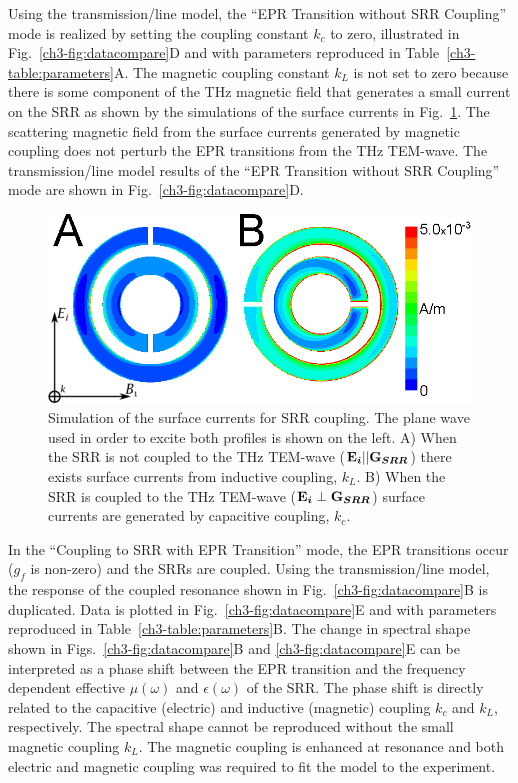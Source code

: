 Using the transmission\-/line model, the ``EPR Transition without SRR Coupling'' mode is realized by setting the coupling constant $k_c$ to zero, illustrated in Fig.~\ref{ch3-fig:datacompare}D and with parameters reproduced in Table~\ref{ch3-table:parameters}A. The magnetic coupling constant $k_L$ is not set to zero because there is some component of the THz magnetic field that generates a small current on the SRR as shown by the simulations of the surface currents in Fig.~\ref{ch3-fig:surfacecurrent}. The scattering magnetic field from the surface currents generated by magnetic coupling does not perturb the EPR transitions from the THz TEM-wave. The transmission\-/line model results of the ``EPR Transition without SRR Coupling'' mode are shown in Fig.~\ref{ch3-fig:datacompare}D.

\begin{figure}[htbp]\centering
  \includegraphics{Kapitel/Ch3-Images/SurfaceCurrent-THz.eps}%
  \caption[Simulation of the surface currents for SRR coupling.]{Simulation of the surface currents for SRR coupling. The plane wave used in order to excite both profiles is shown on the left. A) When the SRR is not coupled to the THz TEM-wave ($\textbf{E}\boldsymbol{_{i}}||\textbf{G}\boldsymbol{_{SRR}}$) there exists surface currents from inductive coupling, $k_L$. B) When the SRR is coupled to the THz TEM-wave ($\textbf{E}\boldsymbol{_{i}}\perp\textbf{G}\boldsymbol{_{SRR}}$) surface currents are generated by capacitive coupling, $k_c$.} \label{ch3-fig:surfacecurrent}
\end{figure}


In the ``Coupling to SRR with EPR Transition'' mode, the EPR transitions occur ($g_f$ is non-zero) and the SRRs are coupled. Using the transmission\-/line model, the response of the coupled resonance shown in Fig.~\ref{ch3-fig:datacompare}B is duplicated. Data is plotted in Fig.~\ref{ch3-fig:datacompare}E and with parameters reproduced in Table~\ref{ch3-table:parameters}B. The change in spectral shape shown in Figs.~\ref{ch3-fig:datacompare}B and \ref{ch3-fig:datacompare}E can be interpreted as a phase shift between the EPR transition and the frequency dependent effective $\mu(\omega)$ and $\epsilon(\omega)$ of the SRR. The phase shift is directly related to the capacitive (electric) and inductive (magnetic) coupling $k_c$ and $k_L$, respectively. The spectral shape cannot be reproduced without the small magnetic coupling $k_L$. The magnetic coupling is enhanced at resonance and both electric and magnetic coupling was required to fit the model to the experiment.

